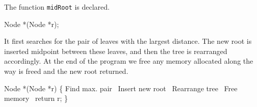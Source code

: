 \nwendcode{}\nwdocspar
The function \texttt{midRoot} is declared.

\nwenddocs{}\plusendmoddef\nwstartdeflinemarkup{}\nwenddeflinemarkup
Node *(Node *r);

\nwendcode{}\nwdocspar
It first searches for the pair of leaves with the largest
distance. The new root is inserted midpoint between these leaves, and
then the tree is rearranged accordingly. At the end of the program we
free any memory allocated along the way is freed and the new root
returned.

\nwenddocs{}\plusendmoddef\nwstartdeflinemarkup{}\nwenddeflinemarkup
Node *(Node *r) \{
  \LA{}Find max. pair~{\nwtagstyle{}}\RA{}
  \LA{}Insert new root~{\nwtagstyle{}}\RA{}
  \LA{}Rearrange tree~{\nwtagstyle{}}\RA{}
  \LA{}Free memory~{\nwtagstyle{}}\RA{}
  return r;
\}

